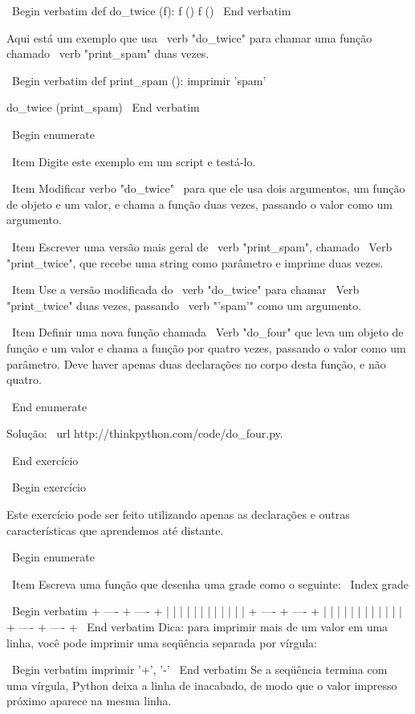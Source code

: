 \documentclass[10pt]{book}
\begin{document}
{\ Begin {verbatim}
def do_twice (f):
    f ()
    f ()
\ End {verbatim}

Aqui está um exemplo que usa \ verb "do_twice" para chamar uma função
chamado \ verb "print_spam" duas vezes.

\ Begin {verbatim}
def print_spam ():
    imprimir 'spam'

do_twice (print_spam)
\ End {verbatim}

\ Begin {enumerate}

\ Item Digite este exemplo em um script e testá-lo.

\ Item Modificar verbo "do_twice" \ para que ele usa dois argumentos, um
função de objeto e um valor, e chama a função duas vezes,
passando o valor como um argumento.

\ Item Escrever uma versão mais geral de \ verb "print_spam", chamado
\ Verb "print_twice", que recebe uma string como parâmetro e imprime
duas vezes.

\ Item Use a versão modificada do \ verb "do_twice" para chamar
\ Verb "print_twice" duas vezes, passando \ verb "'spam'" como um argumento.

\ Item Definir uma nova função chamada 
\ Verb "do_four" que leva um objeto de função e um valor
e chama a função por quatro vezes, passando o valor
como um parâmetro. Deve haver apenas
duas declarações no corpo desta função, e não quatro.

\ End {enumerate}

Solução: \ url {http://thinkpython.com/code/do_four.py}.

\ End {} exercício



\ Begin {} exercício

Este exercício pode ser
feito utilizando apenas as declarações e outras características que aprendemos até
distante.  

\ Begin {enumerate}

\ Item Escreva uma função que desenha uma grade como o seguinte:
\ Index {grade}

\ Begin {verbatim}
+ ---- + ---- +
| | |
| | |
| | |
| | |
+ ---- + ---- +
| | |
| | |
| | |
| | |
+ ---- + ---- +
\ End {verbatim}
%
Dica: para imprimir mais de um valor em uma linha, você pode imprimir
uma seqüência separada por vírgula:

\ Begin {verbatim}
imprimir '+', '-'
\ End {verbatim}
%
Se a seqüência termina com uma vírgula, Python deixa a linha de inacabado,
de modo que o valor impresso próximo aparece na mesma linha.

}
\end{document}
